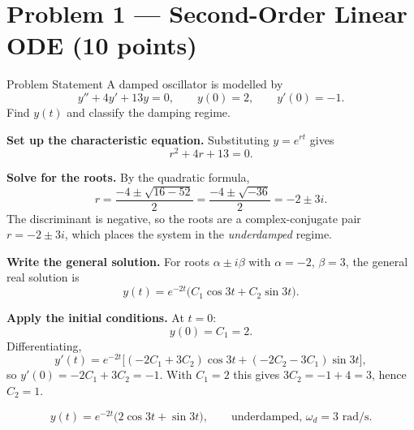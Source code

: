 
\section{Problem 1 --- Second-Order Linear ODE (10 points)}

\begin{problembox}{Problem Statement}
A damped oscillator is modelled by
\[
  y'' + 4y' + 13y = 0, \qquad y(0) = 2, \qquad y'(0) = -1.
\]
Find $y(t)$ and classify the damping regime. \cite{boyce2017elementary}
\end{problembox}

\begin{steps}

\item \textbf{Set up the characteristic equation.} Substituting
$y = e^{rt}$ gives
\[
  r^2 + 4r + 13 = 0.
\]


\item \textbf{Solve for the roots.} By the quadratic formula,
\[
  r = \frac{-4 \pm \sqrt{16 - 52}}{2} = \frac{-4 \pm \sqrt{-36}}{2}
    = -2 \pm 3i.
\]
The discriminant is negative, so the roots are a complex-conjugate pair
$r = -2 \pm 3i$, which places the system in the \emph{underdamped} regime.


\item \textbf{Write the general solution.} For roots $\alpha \pm i\beta$
with $\alpha = -2$, $\beta = 3$, the general real solution is
\[
  y(t) = e^{-2t}\big(C_1 \cos 3t + C_2 \sin 3t\big).
\]

\item \textbf{Apply the initial conditions.} At $t = 0$:
\[
  y(0) = C_1 = 2.
\]
Differentiating,
\[
  y'(t) = e^{-2t}\big[(-2C_1 + 3C_2)\cos 3t + (-2C_2 - 3C_1)\sin 3t\big],
\]
so $y'(0) = -2C_1 + 3C_2 = -1$. With $C_1 = 2$ this gives
$3C_2 = -1 + 4 = 3$, hence $C_2 = 1$.


\end{steps}

\begin{finalbox}
\[
  y(t) = e^{-2t}\big(2\cos 3t + \sin 3t\big), \qquad \text{underdamped, }
  \omega_d = 3 \text{ rad/s}.
\]
\end{finalbox}

